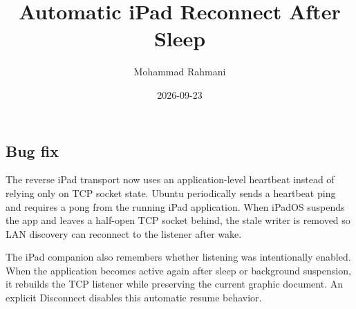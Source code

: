 \documentclass[a4paper]{article}
\title{Automatic iPad Reconnect After Sleep}
\date{2026-09-23}
\author{Mohammad Rahmani}
\begin{document}
   \maketitle

   \begin{preview}
      \section{Bug fix}
      The reverse iPad transport now uses an application-level heartbeat instead of
      relying only on TCP socket state.  Ubuntu periodically sends a heartbeat ping
      and requires a pong from the running iPad application.  When iPadOS suspends
      the app and leaves a half-open TCP socket behind, the stale writer is removed
      so LAN discovery can reconnect to the listener after wake.

      The iPad companion also remembers whether listening was intentionally enabled.
      When the application becomes active again after sleep or background suspension,
      it rebuilds the TCP listener while preserving the current graphic document.
      An explicit Disconnect disables this automatic resume behavior.
   \end{preview}
\end{document}
